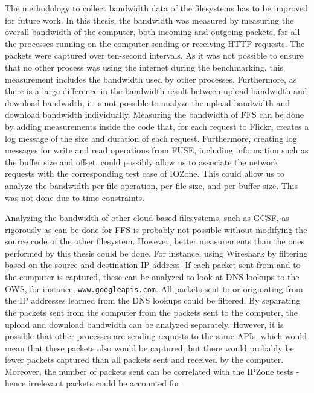 The methodology to collect bandwidth data of the filesystems has to be improved for future work. In this thesis, the bandwidth was measured by measuring the overall bandwidth of the computer, both incoming and outgoing packets, for all  the processes running on the computer sending or receiving HTTP requests. The packets were captured over \mbox{ten-second} intervals. As it was not possible to ensure that no other process was using the internet during the benchmarking, this measurement includes the bandwidth used by other processes. Furthermore, as there is a large difference in the bandwidth result between upload bandwidth and download bandwidth, it is not possible to analyze the upload bandwidth and download bandwidth individually. Measuring the bandwidth of \gls{FFS} can be done by adding measurements inside the code that, for each request to Flickr, creates a log message of the size and duration of each request. Furthermore, creating log messages for write and read operations from \gls{FUSE}, including information such as the buffer size and offset, could possibly allow us to associate the network requests with the corresponding test case of IOZone. This could allow us to analyze the bandwidth per file operation, per file size, and per buffer size. This was not done due to time constraints.

Analyzing the bandwidth of other \mbox{cloud-based} filesystems, such as \gls{GCSF}, as rigorously as can be done for \gls{FFS} is probably not possible without modifying the source code of the other filesystem. However, better measurements than the ones performed by this thesis could be done. For instance, using Wireshark by filtering based on the source and destination IP address. If each packet sent from and to the computer is captured, these can be analyzed to look at DNS lookups to the \gls{OWS}, for instance, \texttt{www.googleapis.com}. All packets sent to or originating from the IP addresses learned from the DNS lookups could be filtered. By separating the packets sent from the computer from the packets sent to the computer, the upload and download bandwidth can be analyzed separately. However, it is possible that other processes are sending requests to the same \glspl{API}, which would mean that these packets also would be captured, but there would probably be fewer packets captured than all packets sent and received by the computer. Moreover, the number of packets sent can be correlated with the IPZone tests - hence irrelevant packets could be accounted for. 

%
%
%
%
%
%
%
%
%

